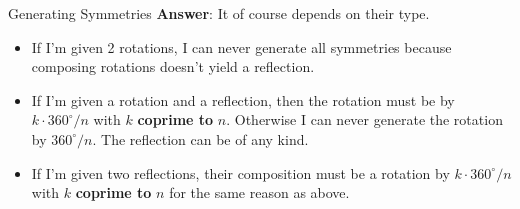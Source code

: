 \documentclass[final]{beamer}
\newlength{\colwidth}
\begin{document}
\begin{frame}[t]
\begin{columns}[t]
\begin{column}{\colwidth}
\begin{block}{Generating Symmetries}
  \textbf{Answer}: It of course depends on their type.
  \begin{itemize}[label=\textcolor{gevodarkblue}{\textbullet},leftmargin=3ex]
   \item If I'm given 2 rotations, I can never generate all symmetries because
    composing rotations doesn't yield a reflection.
   \item If I'm given a rotation and a reflection, then the rotation must be by
    $k \cdot 360^{ \circ } / n$ with $k$ \textbf{coprime to} $n$. Otherwise I can
    never generate the rotation by $360^{ \circ } / n$. The reflection can be of
    any kind.
   \item If I'm given two reflections, their composition must be a rotation by $k
    \cdot 360^{ \circ } / n$ with $k$ \textbf{coprime to} $n$ for the same reason
    as above.
  \end{itemize}
 \end{block}


\end{column}
\end{columns}
\end{frame}
\end{document}

